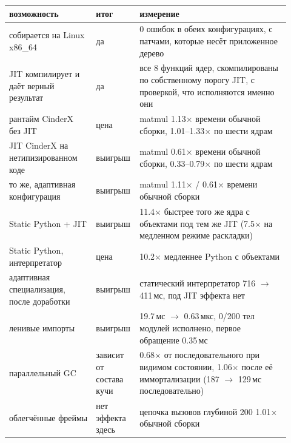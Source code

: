 \begin{tabular}{p{0.30\linewidth}p{0.10\linewidth}p{0.52\linewidth}}
\toprule
возможность & итог & измерение \\
\midrule
собирается на Linux x86\_64 & да & 0 ошибок в обеих конфигурациях, с патчами, которые несёт приложенное дерево \\
JIT компилирует и даёт верный результат & да & все 8 функций ядер, скомпилированы по собственному порогу JIT, с проверкой, что исполняются именно они \\
рантайм CinderX без JIT & цена & matmul 1.13$\times$ времени обычной сборки, 1.01--1.33$\times$ по шести ядрам \\
JIT CinderX на нетипизированном коде & выигрыш & matmul 0.61$\times$ времени обычной сборки, 0.33--0.79$\times$ по шести ядрам \\
то же, адаптивная конфигурация & выигрыш & matmul 1.11$\times$ / 0.61$\times$ времени обычной сборки \\
Static Python + JIT & выигрыш & 11.4$\times$ быстрее того же ядра с объектами под тем же JIT (7.5$\times$ на медленном режиме раскладки) \\
Static Python, интерпретатор & цена & 10.2$\times$ медленнее Python с объектами \\
адаптивная специализация, после доработки & выигрыш & статический интерпретатор 716 $\to$ 411\,мс, под JIT эффекта нет \\
ленивые импорты & выигрыш & 19.7\,мс $\to$ 0.63\,мкс, 0/200 тел модулей исполнено, первое обращение 0.35\,мс \\
параллельный GC & зависит от состава кучи & 0.68$\times$ от последовательного при видимом состоянии, 1.06$\times$ после её иммортализации (187 $\to$ 129\,мс последовательно) \\
облегчённые фреймы & нет эффекта здесь & цепочка вызовов глубиной 200 1.01$\times$ обычной сборки \\
\bottomrule
\end{tabular}
